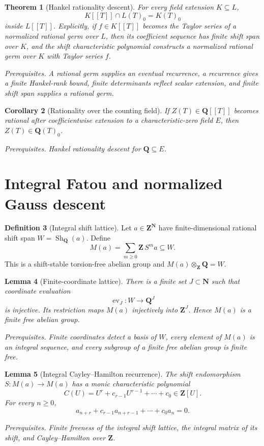 \documentclass[10pt]{article}
\newtheorem{theorem}{Theorem}[section]
\newtheorem{corollary}[theorem]{Corollary}
\newtheorem{lemma}[theorem]{Lemma}
\theoremstyle{definition}
\newtheorem{definition}[theorem]{Definition}
\newcommand{\deps}[1]{\par\smallskip\noindent\textit{Prerequisites.} #1}
\begin{document}
\begin{theorem}[Hankel rationality descent]
For every field extension \(K\subseteq L\),
\[
 \boxed{K[[T]]\cap L(T)_0=K(T)_0}
\]
inside \(L[[T]]\).  Explicitly, if \(f\in K[[T]]\) becomes the Taylor
series of a normalized rational germ over \(L\), then its coefficient
sequence has finite shift span over \(K\), and the shift characteristic
polynomial constructs a normalized rational germ over \(K\) with Taylor
series \(f\).
\deps{A rational germ supplies an eventual recurrence, a recurrence gives
a finite Hankel-rank bound, finite determinants reflect scalar extension,
and finite shift span supplies a rational germ.}
\end{theorem}

\begin{corollary}[Rationality over the counting field]
If \(Z(T)\in\mathbf Q[[T]]\) becomes rational after coefficientwise
extension to a characteristic-zero field \(E\), then
\(Z(T)\in\mathbf Q(T)_0\).
\deps{Hankel rationality descent for \(\mathbf Q\subseteq E\).}
\end{corollary}

\section{Integral Fatou and normalized Gauss descent}

\begin{definition}[Integral shift lattice]
Let \(a\in\mathbf Z^{\mathbf N}\) have finite-dimensional rational shift
span \(W=\operatorname{Sh}_{\mathbf Q}(a)\).  Define
\[
 M(a)=\sum_{m\geq0}\mathbf Z\,S^ma\subseteq W.
\]
This is a shift-stable torsion-free abelian group and
\(M(a)\otimes_{\mathbf Z}\mathbf Q=W\).
\end{definition}

\begin{lemma}[Finite-coordinate lattice]
There is a finite set \(J\subset\mathbf N\) such that coordinate evaluation
\[
 \operatorname{ev}_J:W\longrightarrow\mathbf Q^J
\]
is injective.  Its restriction maps \(M(a)\) injectively into
\(\mathbf Z^J\).  Hence \(M(a)\) is a finite free abelian group.
\deps{Finite coordinates detect a basis of \(W\), every element of
\(M(a)\) is an integral sequence, and every subgroup of a finite free
abelian group is finite free.}
\end{lemma}

\begin{lemma}[Integral Cayley--Hamilton recurrence]
The shift endomorphism \(S:M(a)\to M(a)\) has a monic characteristic
polynomial
\[
 C(U)=U^r+c_{r-1}U^{r-1}+\cdots+c_0\in\mathbf Z[U].
\]
For every \(n\geq0\),
\[
 a_{n+r}+c_{r-1}a_{n+r-1}+\cdots+c_0a_n=0.
\]
\deps{Finite freeness of the integral shift lattice, the integral matrix of
its shift, and Cayley--Hamilton over \(\mathbf Z\).}
\end{lemma}
\end{document}
